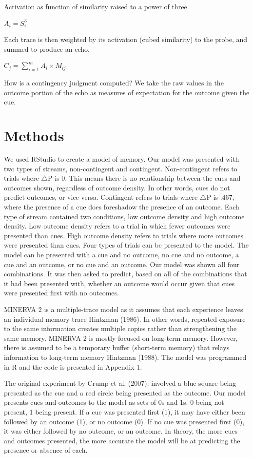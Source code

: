 \documentclass[
  english,
  man,floatsintext]{apa6}
\begin{document}
Activation as function of similarity raised to a power of three.

\(A_i = S_i^3\)

Each trace is then weighted by its activation (cubed similarity) to the probe, and summed to produce an echo.

\(C_j = \sum_{i=1}^m A_i \times M_{ij}\)

How is a contingency judgment computed? We take the raw values in the outcome portion of the echo as measures of expectation for the outcome given the cue.

\hypertarget{methods}{%
\section{Methods}\label{methods}}

We used RStudio to create a model of memory. Our model was presented with two types of streams, non-contingent and contingent. Non-contingent refers to trials where \(\triangle\)P is 0. This means there is no relationship between the cues and outcomes shown, regardless of outcome density. In other words, cues do not predict outcomes, or vice-versa. Contingent refers to trials where \(\triangle\)P is .467, where the presence of a cue does foreshadow the presence of an outcome. Each type of stream contained two conditions, low outcome density and high outcome density. Low outcome density refers to a trial in which fewer outcomes were presented than cues. High outcome density refers to trials where more outcomes were presented than cues. Four types of trials can be presented to the model. The model can be presented with a cue and no outcome, no cue and no outcome, a cue and an outcome, or no cue and an outcome. Our model was shown all four combinations. It was then asked to predict, based on all of the combinations that it had been presented with, whether an outcome would occur given that cues were presented first with no outcomes.

MINERVA 2 is a multiple-trace model as it assumes that each experience leaves an individual memory trace Hintzman (1986). In other words, repeated exposure to the same information creates multiple copies rather than strengthening the same memory. MINERVA 2 is mostly focused on long-term memory. However, there is assumed to be a temporary buffer (short-term memory) that relays information to long-term memory Hintzman (1988). The model was programmed in R and the code is presented in Appendix 1.

The original experiment by Crump et al. (2007). involved a blue square being presented as the cue and a red circle being presented as the outcome. Our model presents cues and outcomes to the model as sets of 0s and 1s. 0 being not present, 1 being present. If a cue was presented first (1), it may have either been followed by an outcome (1), or no outcome (0). If no cue was presented first (0), it was either followed by no outcome, or an outcome. In theory, the more cues and outcomes presented, the more accurate the model will be at predicting the presence or absence of each.
\end{document}
